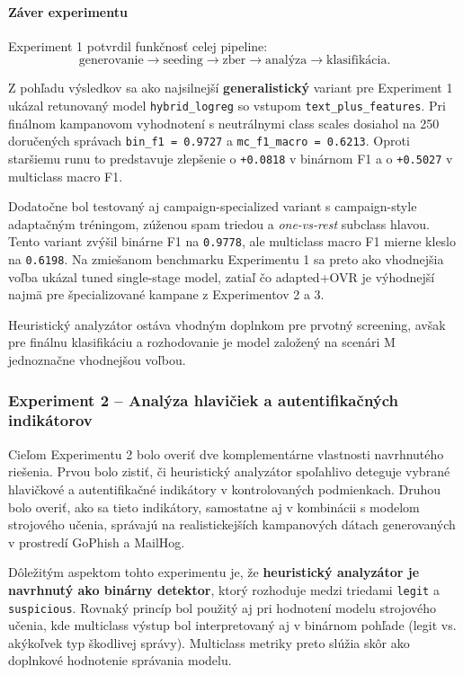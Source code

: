 \documentclass[conference]{IEEEtran}
\begin{document}
\paragraph{Záver experimentu}

Experiment 1 potvrdil funkčnosť celej pipeline:
\[
\text{generovanie} \rightarrow \text{seeding} \rightarrow \text{zber} \rightarrow \text{analýza} \rightarrow \text{klasifikácia}.
\]

Z pohľadu výsledkov sa ako najsilnejší \textbf{generalistický} variant pre Experiment 1 ukázal retunovaný model \texttt{hybrid\_logreg} so vstupom \texttt{text\_plus\_features}. Pri finálnom kampanovom vyhodnotení s neutrálnymi class scales dosiahol na 250 doručených správach \texttt{bin\_f1 = 0.9727} a \texttt{mc\_f1\_macro = 0.6213}. Oproti staršiemu runu to predstavuje zlepšenie o \texttt{+0.0818} v binárnom F1 a o \texttt{+0.5027} v multiclass macro F1.

Dodatočne bol testovaný aj campaign-specialized variant s campaign-style adaptačným tréningom, zúženou spam triedou a \textit{one-vs-rest} subclass hlavou. Tento variant zvýšil binárne F1 na \texttt{0.9778}, ale multiclass macro F1 mierne kleslo na \texttt{0.6198}. Na zmiešanom benchmarku Experimentu 1 sa preto ako vhodnejšia voľba ukázal tuned single-stage model, zatiaľ čo adapted+OVR je výhodnejší najmä pre špecializované kampane z Experimentov 2 a 3.

Heuristický analyzátor ostáva vhodným doplnkom pre prvotný screening, avšak pre finálnu klasifikáciu a rozhodovanie je model založený na scenári M jednoznačne vhodnejšou voľbou.

\subsubsection{Experiment 2 – Analýza hlavičiek a autentifikačných indikátorov}\label{epx2}

Cieľom Experimentu 2 bolo overiť dve komplementárne vlastnosti navrhnutého riešenia. 
Prvou bolo zistiť, či heuristický analyzátor spoľahlivo deteguje vybrané hlavičkové a autentifikačné indikátory v kontrolovaných podmienkach. Druhou bolo overiť, ako sa tieto indikátory, samostatne aj v kombinácii s modelom strojového učenia, správajú na realistickejších kampanových dátach generovaných v prostredí GoPhish a MailHog.

Dôležitým aspektom tohto experimentu je, že \textbf{heuristický analyzátor je navrhnutý ako binárny detektor}, ktorý rozhoduje medzi triedami \texttt{legit} a \texttt{suspicious}. Rovnaký princíp bol použitý aj pri hodnotení modelu strojového učenia, kde multiclass výstup bol interpretovaný aj v binárnom pohľade (legit vs. akýkoľvek typ škodlivej správy). Multiclass metriky preto slúžia skôr ako doplnkové hodnotenie správania modelu.
\end{document}
